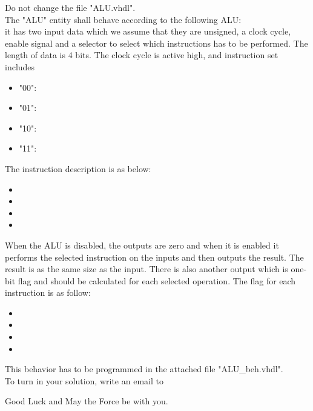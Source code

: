 \documentclass[a4paper,12pt]{article}
\begin{document}
Do not change the file "ALU.vhdl".
\\

The "ALU" entity shall behave according to the following ALU:
\\
it has two input data which we assume that they are unsigned, a clock cycle, enable signal and a selector to select which instructions has to be performed. The length of data is 4 bits. The clock cycle is active high, and instruction set includes %
\\
\begin{itemize}
\item "00": %
\item "01": %
\item "10": %
\item "11": %
\end{itemize}
\vspace{0.3cm}

The instruction description is as below:
\begin{itemize}
\item %
\item %
\item %
\item %
\end{itemize}
\vspace{0.3cm}

When the ALU is disabled, the outputs are zero and when it is enabled it performs the selected instruction on the inputs and then outputs the result. The result is as the same size as the input. There is also another output which is one-bit flag and should be calculated for each selected operation. The flag for each instruction is as follow:
\begin{itemize}
\item %
\item %
\item %
\item %
\end{itemize}
\vspace{0.3cm}

This behavior has to be programmed in the attached file "ALU\_beh.vhdl". 
\\

To turn in your solution, write an email to %

\vspace{0.7cm}

Good Luck and May the Force be with you.
\end{document}
